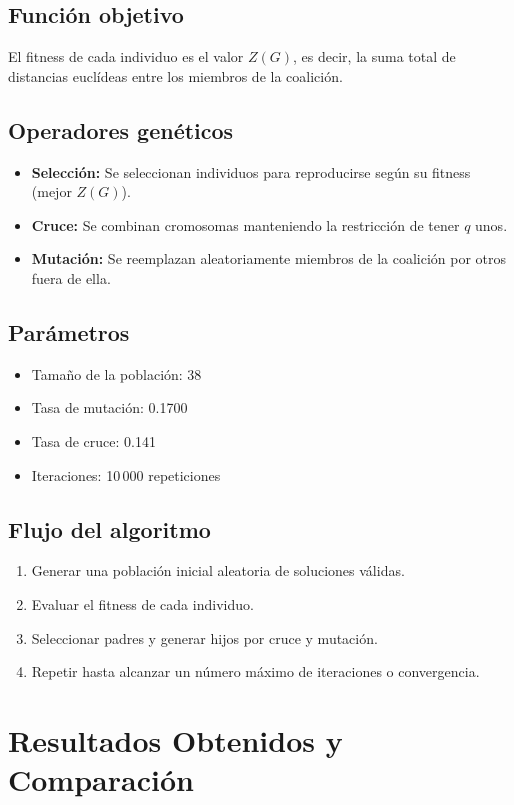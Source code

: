 \documentclass[12pt]{article}
\begin{document}
\subsection*{Función objetivo}
El fitness de cada individuo es el valor $Z(G)$, es decir, la suma total de distancias euclídeas entre los miembros de la coalición.

\subsection*{Operadores genéticos}
\begin{itemize}
    \item \textbf{Selección:} Se seleccionan individuos para reproducirse según su fitness (mejor $Z(G)$).
    \item \textbf{Cruce:} Se combinan cromosomas manteniendo la restricción de tener $q$ unos.
    \item \textbf{Mutación:} Se reemplazan aleatoriamente miembros de la coalición por otros fuera de ella.
\end{itemize}

\subsection*{Parámetros}
\begin{itemize}
    \item Tamaño de la población: 38
    \item Tasa de mutación: 0.1700
    \item Tasa de cruce: 0.141
    \item Iteraciones: 10\,000 repeticiones
\end{itemize}

\subsection*{Flujo del algoritmo}
\begin{enumerate}
    \item Generar una población inicial aleatoria de soluciones válidas.
    \item Evaluar el fitness de cada individuo.
    \item Seleccionar padres y generar hijos por cruce y mutación.
    \item Repetir hasta alcanzar un número máximo de iteraciones o convergencia.
\end{enumerate}

\section{Resultados Obtenidos y Comparación}
\end{document}
